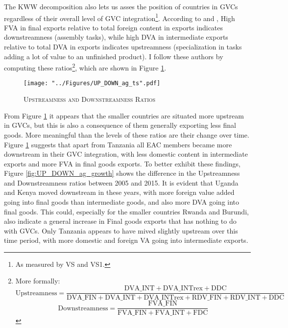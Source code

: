 \documentclass[a4paper]{article}
\begin{document}
The KWW decomposition also lets us asses the position of countries in GVCs regardless of their overall level of GVC integration\footnote{As measured by VS and VS1.}. According to \citet{Kummritz20162} and \citet{wang2013quantifying}, High FVA in final exports relative to total foreign content in exports indicates downstreamness (assembly tasks), while high DVA in intermediate exports relative to total DVA in exports indicates upstreamness (specialization in tasks adding a lot of value to an unfinished product). I follow these authors by computing these ratios\footnote{More formally: $$\text{Upstreamness} = \frac{\text{DVA\_INT} + \text{DVA\_INTrex} + \text{DDC}}{\text{DVA\_FIN} + \text{DVA\_INT} + \text{DVA\_INTrex} + \text{RDV\_FIN} + \text{RDV\_INT} + \text{DDC}}$$  
$$\text{Downstreamness} = \frac{\text{FVA\_FIN}}{\text{FVA\_FIN} + \text{FVA\_INT} + \text{FDC}}$$}, which are shown in Figure \ref{fig:UP_DOWN_ag_ts}.


\begin{figure}[h!]
\centering
\caption{\label{fig:UP_DOWN_ag_ts}\textsc{Upstreamness and Downstreamness Ratios}}
\texttt{[image: "../Figures/UP\_DOWN\_ag\_ts".pdf]} %
\end{figure}
\FloatBarrier

From Figure \ref{fig:UP_DOWN_ag_ts} it appears that the smaller countries are situated more upstream in GVCs, but this is also a consequence of them generally exporting less final goods. More meaningful than the levels of these ratios are their change over time. Figure \ref{fig:UP_DOWN_ag_ts} suggests that apart from Tanzania all EAC members became more downstream in their GVC integration, with less domestic content in intermediate exports and more FVA in final goods exports. To better exhibit these findings, Figure \ref{fig:UP_DOWN_ag_growth} shows the difference in the Upstreamness and Downstreamness ratios between 2005 and 2015. It is evident that Uganda and Kenya moved downstream in these years, with more foreign value added going into final goods than intermediate goods, and also more DVA going into final goods. This could, especially for the smaller countries Rwanda and Burundi, also indicate a general increase in Final goods exports that has nothing to do with GVCs. Only Tanzania appears to have mived slightly upstream over this time period, with more domestic and foreign VA going into intermediate exports. 
\end{document}

